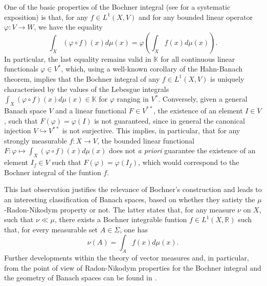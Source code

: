 \documentclass{amsart}
\theoremstyle{definition}
\theoremstyle{plain}
\newcommand{\K}{\mathbb{K}}
\newcommand{\R}{\mathbb{R}}
\begin{document}
        One of the basic properties of the Bochner integral (see \cite{Hytoenen/van_Neerven/Veraar/Weis2016} for a systematic exposition) is that, for any $f \in L^1(X,V)$ and for any bounded linear operator $\varphi \colon V \rightarrow W$, we have the equality
        \begin{equation}
        \label{eq:linear forms}
            \int_X \left(\varphi \circ f \right)(x) d\mu(x) = \varphi \left( \int_X f(x) d\mu(x) \right).
        \end{equation}        
        In particular, the last equality remains valid in $\K$ for all continuous linear functionals $\varphi \in V^*$, which, using a well-known corollary of the Hahn-Banach theorem, implies that the Bochner integral of any $f \in L^1(X,V)$ is uniquely characterised by the values of the Lebesgue integrals $\int_X \left(\varphi \circ f \right)(x) d\mu(x)\in \K$ for $\varphi$ ranging in $V^*$.
        Conversely, given a general Banach space $V$ and a linear functional $F \in V^{**}$, the existence of an element $I \in V$, such that $F(\varphi) = \varphi(I)$ is not guaranteed, since in general the canonical injection $V\hookrightarrow V^{**}$ is not surjective. 
        This implies, in particular, that for any strongly measurable $f \colon X \rightarrow V$, the bounded linear functional $F \colon \varphi \mapsto \int_X \left(\varphi \circ f \right)(x) d\mu(x)$ does not \textit{a priori} guarantee the existence of an element $I_f\in V$ such that $F(\varphi)=\varphi(I_f)$, which would correspond to the Bochner integral of the funtion $f$.

        This last observation justifies the relevance of Bochner's construction and leads to an interesting classification of Banach spaces, based on whether they satisty the $\mu$-Radon-Nikodym property or not. 
        The latter states that, for any measure $\nu$ on $X$, such that $\nu \ll \mu$, there exists a Bochner integrable funtion $f \in L^1(X,\R)$ such that, for every measurable set $A \in \Sigma$, one has
        \begin{equation*}
            \nu(A) = \int_A f(x) d\mu(x).
        \end{equation*}
        Further developments within the theory of vector measures and, in particular, from the point of view of Radon-Nikodym properties for the Bochner integral and the geometry of Banach spaces can be found in \cite{Diestel/Uhl1977}.
\end{document}
